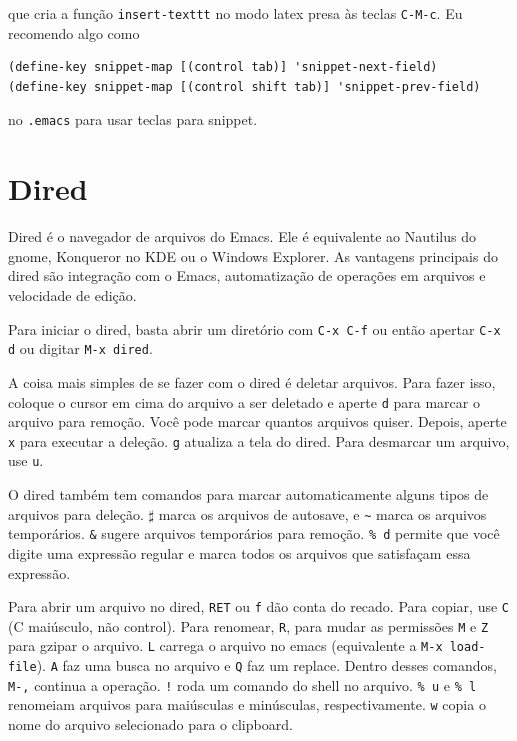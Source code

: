 \documentclass[12pt,brazil]{book}
\begin{document}
que cria a função \texttt{insert-texttt} no modo latex presa às teclas
\texttt{C-M-c}. Eu recomendo algo como

\begin{verbatim}
(define-key snippet-map [(control tab)] 'snippet-next-field)
(define-key snippet-map [(control shift tab)] 'snippet-prev-field)
\end{verbatim}

no \texttt{.emacs} para usar teclas para snippet.

\section{Dired}
\label{sec:dired}

Dired é o navegador de arquivos do Emacs. Ele é equivalente ao
Nautilus do gnome, Konqueror no KDE ou o Windows Explorer. As
vantagens principais do dired são integração com o Emacs,
automatização de operações em arquivos e velocidade de edição.

Para iniciar o dired, basta abrir um diretório com \texttt{C-x C-f} ou
então apertar \texttt{C-x d} ou digitar \texttt{M-x dired}.

A coisa mais simples de se fazer com o dired é deletar arquivos. Para
fazer isso, coloque o cursor em cima do arquivo a ser deletado e aperte
\texttt{d} para marcar o arquivo para remoção. Você pode marcar
quantos arquivos quiser. Depois, aperte \texttt{x} para executar a
deleção. \texttt{g} atualiza a tela do dired. Para desmarcar um
arquivo, use \texttt{u}.

O dired também tem comandos para marcar automaticamente alguns
tipos de arquivos para deleção. \texttt{$\sharp$} marca os arquivos de
autosave, e \texttt{\~} marca os arquivos temporários. \texttt{\&}
sugere arquivos temporários para remoção. \texttt{\% d} permite que você
digite uma expressão regular e marca todos os arquivos que satisfaçam
essa expressão.

Para abrir um arquivo no dired, \texttt{RET} ou \texttt{f} dão conta
do recado. Para copiar, use \texttt{C} (C maiúsculo, não
control). Para renomear, \texttt{R}, para mudar as permissões
\texttt{M} e \texttt{Z} para gzipar o arquivo. \texttt{L} carrega o
arquivo no emacs (equivalente a \texttt{M-x load-file}). \texttt{A}
faz uma busca no arquivo e \texttt{Q} faz um replace. Dentro desses
comandos, \texttt{M-,} continua a operação. \texttt{!} roda um comando
do shell no arquivo. \texttt{\% u} e \texttt{\% l} renomeiam arquivos
para maiúsculas e minúsculas, respectivamente. \texttt{w} copia o nome
do arquivo selecionado para o clipboard.
\end{document}
